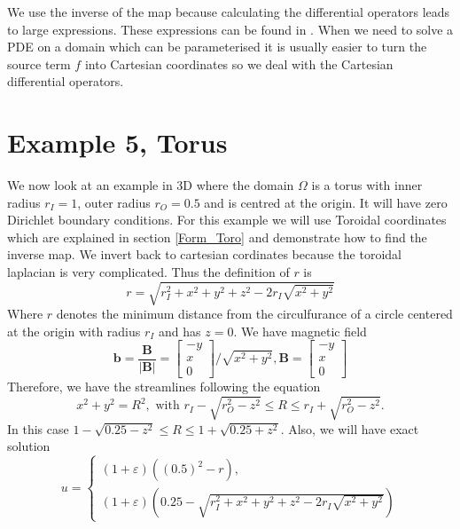 \documentclass[12pt]{ociamthesis}
\begin{document}
We use the inverse of the map because calculating the differential operators leads to large expressions. These expressions can be found in \cite{}. When we need to solve a PDE on a domain which can be parameterised it is usually easier to turn the source term $f$ into Cartesian coordinates so we deal with the Cartesian differential operators.

\section{Example 5, Torus}
We now look at an example in 3D where the domain $\Omega $ is a torus with inner radius $r_I = 1$, outer radius $r_O = 0.5$ and is centred at the origin. It will have zero Dirichlet boundary conditions. For this example we will use Toroidal coordinates which are explained in section \ref{Form_Toro} and demonstrate how to find the inverse map. We invert back to cartesian cordinates because the toroidal laplacian \cite{} is very complicated. Thus the definition of $r$ is
\begin{equation}
r = \sqrt{r_I^2 + x^2 + y^2 + z^2 -2r_I\sqrt{x^2+y^2}}
\end{equation}
Where $r$ denotes the minimum distance from the circulfurance of a circle centered at the origin with radius $r_I$ and has $z=0$. We have magnetic field 
\begin{equation}
\mathbf{b} = \frac{\mathbf{B}}{|\mathbf{B}|} = 
\left[ \begin{matrix}
-y\\
 x \\
 0
\end{matrix} \right]/\sqrt{x^2+y^2}, 
\mathbf{B} = \left[ \begin{matrix}
-y\\
 x\\
 0
\end{matrix} \right]
\end{equation}
Therefore, we have the streamlines following the equation
\begin{equation}
x^2 + y^2 = R^2, \text{ with } r_I-\sqrt{r_O^2-z^2} \leq R \leq r_I+\sqrt{r_O^2-z^2}.
\end{equation}
In this case $1-\sqrt{0.25-z^2} \leq R \leq 1 + \sqrt{0.25+z^2}$. Also, we will have exact solution
\begin{equation}
u = 
\begin{cases}
(1+\varepsilon)((0.5)^2 - r ),\\
(1+\varepsilon)(0.25 -  \sqrt{r_I^2 + x^2 + y^2 + z^2 -2r_I\sqrt{x^2+y^2}})
\end{cases}
\end{equation}
\end{document}
